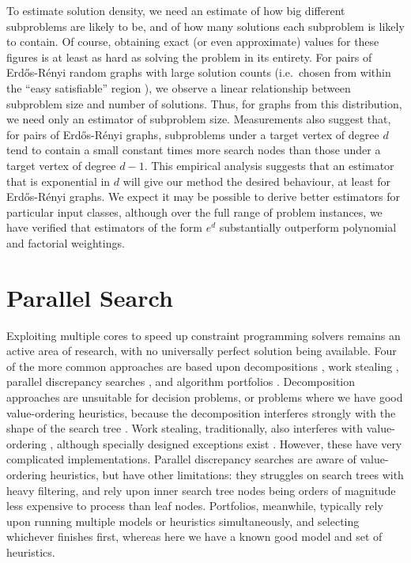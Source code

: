\documentclass[runningheads]{llncs}
\begin{document}
To estimate solution density, we need an estimate of how big different subproblems are likely to be,
and of how many solutions each subproblem is likely to contain. Of course, obtaining exact (or even
approximate) values for these figures is at least as hard as solving the problem in its entirety.
For pairs of Erd\H{o}s-R\'enyi
random graphs with large solution counts (i.e.\ chosen from within the ``easy satisfiable'' region
\cite{DBLP:journals/jair/McCreeshPST18}), we observe a linear relationship between subproblem size
and number of solutions. Thus, for graphs from this distribution, we need only an estimator of
subproblem size. Measurements also suggest that, for pairs of Erd\H{o}s-R\'enyi graphs, subproblems
under a target vertex of degree $d$ tend to contain a small constant times more search nodes than
those under a target vertex of degree $d - 1$.  This empirical analysis suggests that an estimator
that is exponential in $d$ will give our method the desired behaviour, at least for
Erd\H{o}s-R\'enyi graphs. We expect it may be possible to derive better estimators for particular
input classes, although over the full range of problem instances, we have verified that estimators
of the form $e^d$ substantially outperform polynomial and factorial weightings.

\section{Parallel Search}

Exploiting multiple cores to speed up constraint programming solvers remains an active area of
research, with no universally perfect solution being available. Four of the more common approaches
are based upon decompositions
\cite{DBLP:journals/corr/abs-1008-4328,DBLP:journals/jair/MalapertRR16}, work stealing
\cite{DBLP:conf/cp/MichelSH07,DBLP:conf/cp/ChuSS09,DBLP:conf/cp/McCreeshP15,DBLP:conf/cpaior/HoffmannMNPRS018},
parallel discrepancy searches \cite{DBLP:conf/cp/MoisanGQ13,DBLP:conf/cpaior/MoisanQG14}, and
algorithm portfolios \cite{DBLP:conf/lion/LindauerHH15}. Decomposition approaches are unsuitable for
decision problems, or problems where we have good value-ordering heuristics, because the
decomposition interferes strongly with the shape of the search tree
\cite{DBLP:journals/jair/MalapertRR16}. Work stealing, traditionally, also interferes with
value-ordering \cite{DBLP:journals/topc/McCreeshP15}, although specially designed exceptions exist
\cite{DBLP:conf/cp/ChuSS09,DBLP:conf/cp/McCreeshP15,DBLP:conf/cpaior/HoffmannMNPRS018}. However,
these have very complicated implementations. Parallel discrepancy searches are aware of
value-ordering heuristics, but have other limitations: they struggles on search trees with heavy
filtering, and rely upon inner search tree nodes being orders of magnitude less expensive to process
than leaf nodes. Portfolios, meanwhile, typically rely upon running multiple models or heuristics
simultaneously, and selecting whichever finishes first, whereas here we have a known good model and
set of heuristics.
\end{document}
